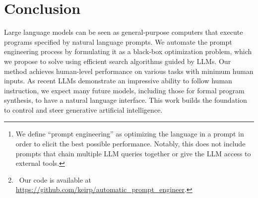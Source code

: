 \documentclass{article} %
\begin{document}
\begin{abstract}
By conditioning on natural language instructions, large language models (LLMs) have displayed impressive capabilities as general-purpose computers. However, task performance depends significantly on the quality of the prompt used to steer the model, and most effective prompts have been handcrafted by humans. Inspired by classical program synthesis and the human approach to prompt engineering, we propose \textit{Automatic Prompt Engineer}\footnote{We define ``prompt engineering'' as optimizing the language in a prompt in order to elicit the best possible performance. Notably, this does not include prompts that chain multiple LLM queries together or give the LLM access to external tools.} (APE) for automatic instruction generation and selection. In our method, we treat the instruction as the ``program,'' optimized by searching over a pool of instruction candidates proposed by an LLM in order to maximize a chosen score function. To evaluate the quality of the selected instruction, we evaluate the zero-shot performance of another LLM following the selected instruction. Extensive experiments show that our automatically generated instructions outperform the prior LLM baseline by a large margin and achieve better or comparable performance to the instructions generated by human annotators on 24/24 Instruction Induction tasks and 17/21 curated BIG-Bench tasks. We conduct extensive qualitative and quantitative analyses to explore the performance of APE. We show that APE-engineered prompts are able to improve few-shot learning performance (by simply prepending them to standard in-context learning prompts), find better zero-shot chain-of-thought prompts, as well as steer models toward truthfulness and/or informativeness. 
\footnote{\ Our code is available at \url{https://github.com/keirp/automatic_prompt_engineer}.}
\end{abstract}







\section{Conclusion}
Large language models can be seen as general-purpose computers that execute programs specified by natural language prompts. We automate the prompt engineering process by formulating it as a black-box optimization problem, which we propose to solve using efficient search algorithms guided by LLMs. Our method achieves human-level performance on various tasks with minimum human inputs. As recent LLMs demonstrate an impressive ability to follow human instruction, we expect many future models, including those for formal program synthesis, to have a natural language interface. This work builds the foundation to control and steer generative artificial intelligence.
\end{document}
